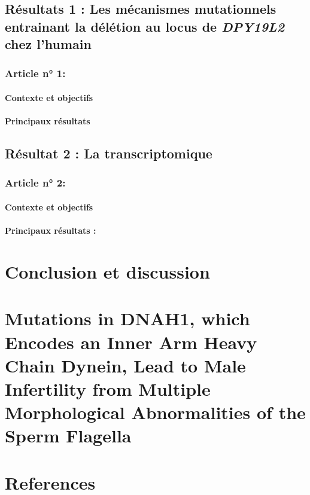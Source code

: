 \documentclass[12pt,twoside]{ugathesis}
\begin{document}
\section{\texorpdfstring{Résultats 1 : Les mécanismes mutationnels
entrainant la délétion au locus de \emph{DPY19L2} chez
l'humain}{Résultats 1 : Les mécanismes mutationnels entrainant la délétion au locus de DPY19L2 chez l'humain}}\label{mecamut}

\subsection{Article n° 1:}\label{article-n-1}

\subsubsection{Contexte et objectifs}\label{contexte-et-objectifs-5}

\subsubsection{Principaux résultats}\label{principaux-resultats-5}

\section{Résultat 2 : La transcriptomique}\label{transcriptome}

\subsection{Article n° 2:}\label{article-n-2}

\subsubsection{Contexte et objectifs}\label{contexte-et-objectifs-6}

\subsubsection{Principaux résultats :}\label{principaux-resultats-6}

\chapter*{Conclusion et discussion}\label{conclusion-et-discussion}

\chapter{Mutations in DNAH1, which Encodes an Inner Arm Heavy Chain
Dynein, Lead to Male Infertility from Multiple Morphological
Abnormalities of the Sperm Flagella}\label{dnah12014}

\chapter*{References}\label{references}


\end{document}
